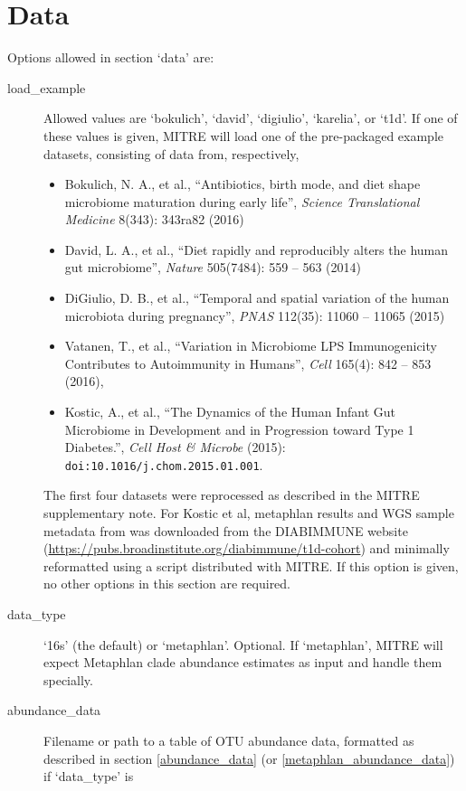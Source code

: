 \documentclass[12pt]{report}
\begin{document}
\section{Data}\label{data}
Options allowed in section `data' are:
\begin{description}
\item[load\_example] Allowed values are `bokulich', `david',
  `digiulio', `karelia', or `t1d'. If one of these values is given,
  MITRE will load one of the pre-packaged example datasets, consisting
  of data from, respectively, \begin{itemize}
  \item Bokulich, N. A., et al., ``Antibiotics, birth mode, and diet
    shape microbiome maturation during early life'', \textit{Science
      Translational Medicine} 8(343): 343ra82 (2016)
  \item David, L. A., et al., ``Diet rapidly and reproducibly alters
    the human gut microbiome'', \textit{Nature} 505(7484): 559 -- 563
    (2014)
  \item DiGiulio, D. B., et al., ``Temporal and spatial variation of
    the human microbiota during pregnancy'', \textit{PNAS} 112(35):
    11060 -- 11065 (2015)
  \item Vatanen, T., et al., ``Variation in Microbiome LPS
    Immunogenicity Contributes to Autoimmunity in Humans'',
    \textit{Cell} 165(4): 842 -- 853 (2016),
  \item Kostic, A., et al., ``The Dynamics of the Human Infant Gut
    Microbiome in Development and in Progression toward Type 1
    Diabetes.'', \textit{Cell Host \& Microbe}
    (2015): \texttt{doi:10.1016/j.chom.2015.01.001}.
\end{itemize}
  The first four datasets were reprocessed as described in the MITRE
  supplementary note. For Kostic et al, metaphlan results and WGS
  sample metadata from was downloaded from the DIABIMMUNE website
  (\url{https://pubs.broadinstitute.org/diabimmune/t1d-cohort}) and
  minimally reformatted using a script distributed with MITRE.  If
  this option is given, no other options in this section are
  required.
\item[data\_type] `16s' (the default) or `metaphlan'. Optional. If
  `metaphlan', MITRE will expect Metaphlan clade abundance estimates
  as input and handle them specially.
\item[abundance\_data] Filename or path to a table of OTU abundance
  data, formatted as described in section \ref{abundance_data} (or
  \ref{metaphlan_abundance_data}) if `data\_type' is

\end{description}
\end{document}
